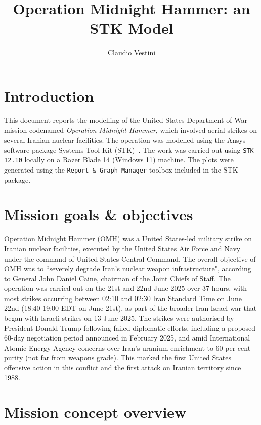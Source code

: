 \documentclass{article}
\title{Operation Midnight Hammer: an STK Model}
\author{Claudio Vestini}
\begin{document}
\maketitle

\section{Introduction} \label{sec:intro}

This document reports the modelling of the United States Department of War mission codenamed \emph{Operation Midnight Hammer}, which involved aerial strikes on several Iranian nuclear facilities. The operation was modelled using the Ansys software package Systems Tool Kit (STK)~\cite{STK:2025}. The work was carried out using \texttt{STK 12.10} locally on a Razer Blade 14 (Windows 11) machine. The plots were generated using the \texttt{Report \& Graph Manager} toolbox included in the STK package.

\section{Mission goals \& objectives} \label{sec:mission_goals}

Operation Midnight Hammer (OMH) was a United States-led military strike on Iranian nuclear facilities, executed by the United States Air Force and Navy under the command of United States Central Command. The overall objective of OMH was to ``severely degrade Iran's nuclear weapon infrastructure", according to General John Daniel Caine, chairman of the Joint Chiefs of Staff. The operation was carried out on the 21st and 22nd June 2025 over 37 hours, with most strikes occurring between 02:10 and 02:30 Iran Standard Time on June 22nd (18:40-19:00 EDT on June 21st), as part of the broader Iran-Israel war that began with Israeli strikes on 13 June 2025. The strikes were authorised by President Donald Trump following failed diplomatic efforts, including a proposed 60-day negotiation period announced in February 2025, and amid International Atomic Energy Agency concerns over Iran's uranium enrichment to 60 per cent purity (not far from weapons grade). This marked the first United States offensive action in this conflict and the first attack on Iranian territory since 1988.

\section{Mission concept overview}
\label{sec:mission_overview}
\end{document}
